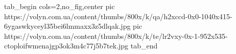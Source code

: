  
 
 
 
 


\ifcmt
  tab_begin cols=2,no_fig,center
     pic https://volyn.com.ua/content/thumbs/800x/k/qa/h2xccd-0x0-1040x415-6ygaswkyceyl35bei6lmmaxx3z5dlqak.jpg
		 pic https://volyn.com.ua/content/thumbs/800x/k/te/lr2vxy-0x-1-952x535-ctoploifwmenajgp3ok3m4c77j5b7tek.jpg
  tab_end
\fi
